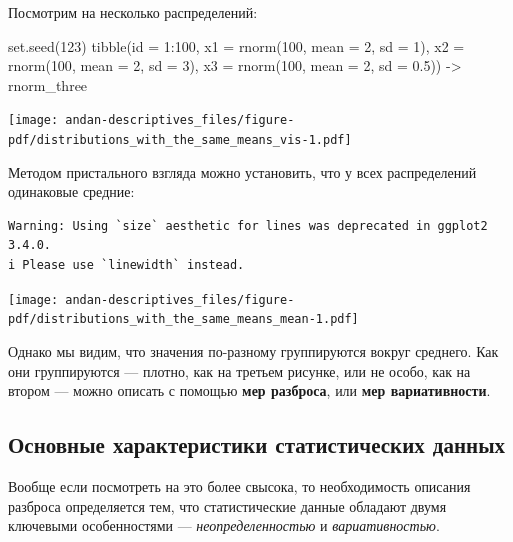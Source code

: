 \documentclass[
  letterpaper,
  DIV=11,
  numbers=noendperiod]{scrreprt}
\newenvironment{Shaded}{}{}
\newcommand{\AttributeTok}[1]{\textcolor[rgb]{0.84,0.23,0.29}{#1}}
\newcommand{\DecValTok}[1]{\textcolor[rgb]{0.00,0.36,0.77}{#1}}
\newcommand{\FloatTok}[1]{\textcolor[rgb]{0.00,0.36,0.77}{#1}}
\newcommand{\FunctionTok}[1]{\textcolor[rgb]{0.44,0.26,0.76}{#1}}
\newcommand{\NormalTok}[1]{\textcolor[rgb]{0.14,0.16,0.18}{#1}}
\newcommand{\OtherTok}[1]{\textcolor[rgb]{0.44,0.26,0.76}{#1}}
\newcommand{\SpecialCharTok}[1]{\textcolor[rgb]{0.00,0.36,0.77}{#1}}
\theoremstyle{definition}
\theoremstyle{remark}
\begin{document}
Посмотрим на несколько распределений:

\begin{Shaded}
\begin{Highlighting}[]
\FunctionTok{set.seed}\NormalTok{(}\DecValTok{123}\NormalTok{)}
\FunctionTok{tibble}\NormalTok{(}\AttributeTok{id =} \DecValTok{1}\SpecialCharTok{:}\DecValTok{100}\NormalTok{,}
       \AttributeTok{x1 =} \FunctionTok{rnorm}\NormalTok{(}\DecValTok{100}\NormalTok{, }\AttributeTok{mean =} \DecValTok{2}\NormalTok{, }\AttributeTok{sd =} \DecValTok{1}\NormalTok{),}
       \AttributeTok{x2 =} \FunctionTok{rnorm}\NormalTok{(}\DecValTok{100}\NormalTok{, }\AttributeTok{mean =} \DecValTok{2}\NormalTok{, }\AttributeTok{sd =} \DecValTok{3}\NormalTok{),}
       \AttributeTok{x3 =} \FunctionTok{rnorm}\NormalTok{(}\DecValTok{100}\NormalTok{, }\AttributeTok{mean =} \DecValTok{2}\NormalTok{, }\AttributeTok{sd =} \FloatTok{0.5}\NormalTok{)) }\OtherTok{{-}\textgreater{}}\NormalTok{ rnorm\_three}
\end{Highlighting}
\end{Shaded}

\texttt{[image: andan-descriptives\_files/figure-pdf/distributions\_with\_the\_same\_means\_vis-1.pdf]}

Методом пристального взгляда можно установить, что у всех распределений
одинаковые средние:

\begin{verbatim}
Warning: Using `size` aesthetic for lines was deprecated in ggplot2 3.4.0.
i Please use `linewidth` instead.
\end{verbatim}

\texttt{[image: andan-descriptives\_files/figure-pdf/distributions\_with\_the\_same\_means\_mean-1.pdf]}

Однако мы видим, что значения по-разному группируются вокруг среднего.
Как они группируются --- плотно, как на третьем рисунке, или не особо,
как на втором --- можно описать с помощью \textbf{мер разброса}, или
\textbf{мер вариативности}.

\subsection{Основные характеристики статистических
данных}\label{key_features_of_data}

Вообще если посмотреть на это более свысока, то необходимость описания
разброса определяется тем, что статистические данные обладают двумя
ключевыми особенностями --- \emph{неопределенностью} и
\emph{вариативностью}.
\end{document}
